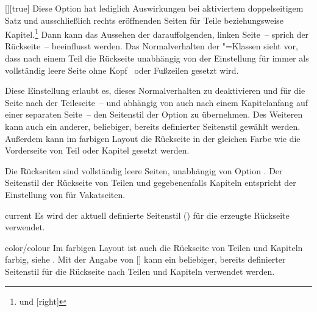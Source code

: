 \documentclass[%
  english,ngerman,%
  headings=optiontoheadandtoc,captions=tableheading,numbers=noenddot,%
  chapterpage,cdfoot,%
]{tudscrman}
\begin{document}
\begin{Declaration}{[\PSet]}[true]%
\printdeclarationlist%
%
%
%
  Diese Option hat lediglich Auswirkungen bei aktiviertem doppelseitigem Satz
  und ausschließlich rechts eröffnenden Seiten für Teile beziehungsweise 
  Kapitel.\footnote{ und [right]}
  Dann kann das Aussehen der darauffolgenden, linken Seite~-- sprich der 
  Rückseite~-- beeinflusst werden. Das Normalverhalten der \KOMAScript"=Klassen 
  sieht vor, dass nach einem Teil die Rückseite unabhängig von der Einstellung 
  für  immer als vollständig leere Seite ohne Kopf~ oder 
  Fußzeilen gesetzt wird.
  
  Diese Einstellung erlaubt es, dieses Normalverhalten zu deaktivieren und für 
  die Seite nach der Teileseite~-- und abhängig von  
  auch nach einem Kapitelanfang auf einer separaten Seite~-- den Seitenstil der 
  Option  zu übernehmen. Des Weiteren kann auch ein 
  anderer, beliebiger, bereits definierter Seitenstil gewählt werden. Außerdem
  kann im farbigen Layout die Rückseite in der gleichen Farbe wie die 
  Vorderseite von Teil oder Kapitel gesetzt werden. \notudscrartcl
  \begin{values}
  \itemfalse
    Die Rückseiten sind vollständig leere Seiten, unabhängig von Option
    .
  \itemtrue*
    Der Seitenstil der Rückseite von Teilen und gegebenenfalls Kapiteln 
    entspricht der Einstellung von  für Vakatseiten.
  \item[current]
    Es wird der aktuell definierte Seitenstil () für die 
    erzeugte Rückseite verwendet.
  \item[color/colour]
    Im farbigen Layout ist auch die Rückseite von Teilen und Kapiteln farbig, 
    siehe .
  \makeatletter{}\makeatother
    Mit der Angabe von [] kann 
    ein beliebiger, bereits definierter Seitenstil für die Rückseite nach 
    Teilen und Kapiteln verwendet werden.
  \end{values}
\end{Declaration}
\end{document}
